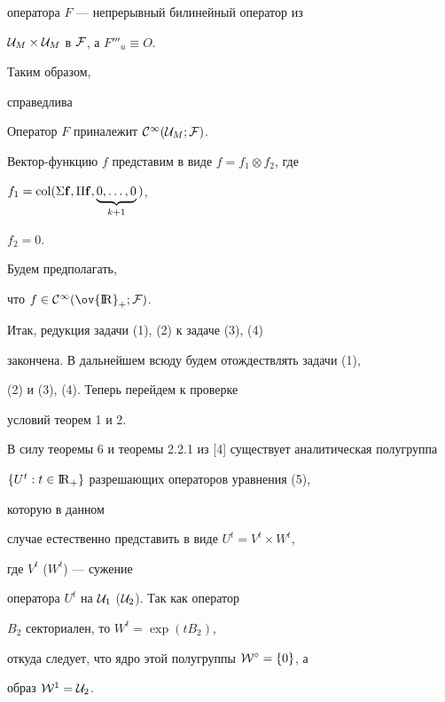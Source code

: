 оператора $F$ --- непрерывный билинейный оператор из


${\cal U}_M \times {\cal U}_M$ в ${\cal F}$, а $F'''_u \equiv O$.


Таким образом,


справедлива





\begin{thm}


Оператор $F$ приналежит ${\cal C}^{\infty}({\cal U}_M; {\cal F})$.


\end{thm}





Вектор-функцию $f$ представим в виде $f=f_1 \otimes f_2$, где


$f_1=\operatorname{col}(\Sigma{\bold f},\Pi{\bold f}, \underbrace{0,\dotsc,0}_{k+1}\,)$,


$f_2=0$.


Будем предполагать,


что $f \in {\cal C}^{\infty}(\ov {\R}_+;{\cal F})$.





Итак, редукция задачи (1), (2) к задаче (3), (4)


закончена. В дальнейшем всюду будем отождествлять задачи (1),


(2) и (3), (4). Теперь перейдем к проверке


условий теорем 1 и 2.





В силу теоремы 6 и теоремы 2.2.1 из [4] существует аналитическая полугруппа


$\{U^t: t \in {{\mathrm I}\!{\mathrm R}}_+\}$ разрешающих операторов уравнения (5),


которую в данном


случае естественно представить в виде $U^t=V^t \times W^t$,


где $V^t$ ($W^t$) --- сужение


оператора $U^t$ на ${\cal U}_1$ (${\cal U}_2$). Так как оператор


$B_2$ секториален, то $W^t=\exp (tB_2)$, 


откуда следует, что ядро этой полугруппы ${\cal W}^{\circ}=\{0 \}$, а


образ $ {\cal W}^1={\cal U}_2$.






